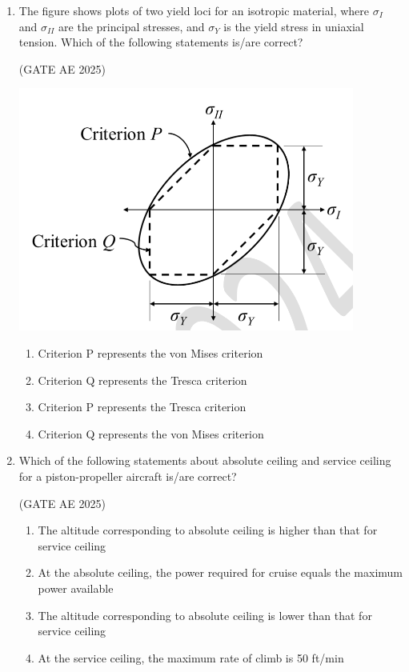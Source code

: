 \documentclass[journal,12pt,onecolumn]{IEEEtran}
\theoremstyle{remark}
\begin{document}
\begin{flushleft}
\begin{enumerate}
\item The figure shows plots of two yield loci for an isotropic material, where $\sigma_I$ and $\sigma_{II}$ are the principal stresses, and $\sigma_Y$ is the yield stress in uniaxial tension. Which of the following statements is/are correct?  

\hfill (GATE AE 2025)

\begin{center}
\includegraphics[width=0.5\columnwidth]{figs/46.png}
\caption{}
    \label{fig:placeholder}
\end{center}

\begin{enumerate}
\item Criterion P represents the von Mises criterion  
\item Criterion Q represents the Tresca criterion  
\item Criterion P represents the Tresca criterion  
\item Criterion Q represents the von Mises criterion  
\end{enumerate} 

\item Which of the following statements about absolute ceiling and service ceiling for a piston-propeller aircraft is/are correct?  

\hfill (GATE AE 2025)

\begin{enumerate}
    \item The altitude corresponding to absolute ceiling is higher than that for service ceiling  
    \item At the absolute ceiling, the power required for cruise equals the maximum power available  
    \item The altitude corresponding to absolute ceiling is lower than that for service ceiling  
    \item At the service ceiling, the maximum rate of climb is 50 ft/min  
\end{enumerate}


\end{enumerate}
\end{flushleft}
\end{document}
